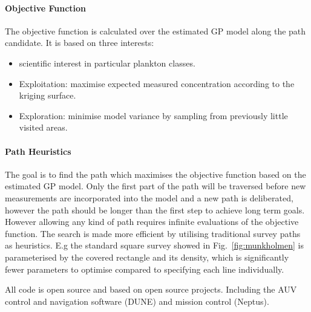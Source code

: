 \documentclass[conference]{IEEEtran}
\begin{document}
\paragraph{Objective Function}
The objective function is calculated over the estimated GP model along the path candidate.
It is based on three interests:
\begin{itemize}
    \item scientific interest in particular plankton classes.
    \item Exploitation: maximise expected measured concentration according to the kriging surface.
    \item Exploration: minimise model variance by sampling from previously little visited areas.
\end{itemize}

\paragraph{Path Heuristics}
The goal is to find the path which maximises the objective function based on the estimated GP model.
Only the first part of the path will be traversed before new measurements are incorporated into the model and a new path is deliberated, however the path should be longer than the first step to achieve long term goals.
However allowing any kind of path requires infinite evaluations of the objective function.
The search is made more efficient by utilising traditional survey paths as heuristics. E.g the standard square survey showed in Fig.~\ref{fig:munkholmen} is parameterised by the covered rectangle and its density, which is significantly fewer parameters to optimise compared to specifying each line individually. 

All code is open source and based on open source projects. Including the AUV control and navigation software (DUNE) and mission control (Neptus). 
\end{document}
